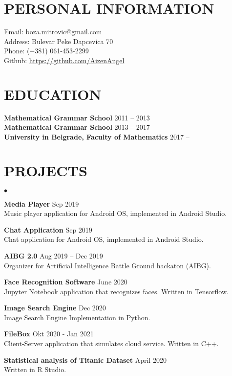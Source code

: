 \documentclass[margin,center]{res}
\newenvironment{list2}{
  \begin{list}{$\bullet$}{%
      \setlength{\itemsep}{0in}
      \setlength{\parsep}{0in} \setlength{\parskip}{0in}
      \setlength{\topsep}{0in} \setlength{\partopsep}{0in}
      \setlength{\leftmargin}{0.2in}}}{\end{list}}
\begin{document}


\begin{resume}
\section{PERSONAL INFORMATION}
{ Email:    }   boza.mitrovic@gmail.com  \\ 
{ Address:} Bulevar Peke Dapcevica 70   \\  
{ Phone: }(+381) 061-453-2299  \\ 
{ Github: } \url{https://github.com/AizenAngel}


\section{EDUCATION}
{\bf Mathematical Grammar School} \hfill 2011 -- 2013\\
{\bf Mathematical Grammar School} \hfill 2013 -- 2017\\
{\bf University in Belgrade, Faculty of Mathematics}  \hfill 2017 -- 


\section{PROJECTS\\}
\begin{list2}
  \item{\bf Media Player} \hfill  Sep 2019\\
    Music player application for Android OS, implemented in Android Studio.
  \item{\bf Chat Application} \hfill Sep 2019\\
    Chat application for Android OS, implemented in Android Studio.
  \item{\bf AIBG 2.0} \hfill Aug 2019 -- Dec 2019 \\ 
    Organizer for Artificial Intelligence Battle Ground hackaton (AIBG).
  \item{\bf Face Recognition Software} \hfill June 2020\\
    Jupyter Notebook application that recognizes faces. Written in Tensorflow.
  \item{\bf Image Search Engine} \hfill Dec 2020 \\
    Image Search Engine Implementation in Python.
  \item{\bf FileBox}  \hfill Okt 2020 - Jan 2021\\
    Client-Server application that simulates cloud service. Written in C++.
  \item{\bf Statistical analysis of Titanic Dataset} \hfill April 2020\\
    Written in R Studio.


\end{list2}
\end{resume}
\end{document}
